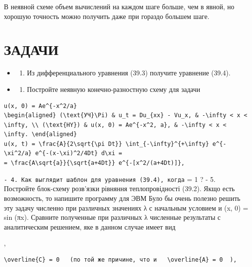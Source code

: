 \documentclass[
  ukrainian,
]{article}
\providecommand{\tightlist}{%
  \setlength{\itemsep}{0pt}\setlength{\parskip}{0pt}}
\begin{document}
В неявной схеме объем вычислений на каждом шаге больше, чем в явной, но
хорошую точность можно получить даже при гораздо большем шаге.

\section{ЗАДАЧИ}\label{ux437ux430ux434ux430ux447ux438-7}

\begin{itemize}
\tightlist
\item
  \begin{enumerate}
  \def\labelenumi{\arabic{enumi}.}
  \tightlist
  \item
    Из дифференциального уравнения (39.3) получите уравнение (39.4).
  \end{enumerate}
\item
  \begin{enumerate}
  \def\labelenumi{\arabic{enumi}.}
  \setcounter{enumi}{1}
  \tightlist
  \item
    Постройте неявную конечно-разностную схему для задачи
  \end{enumerate}
\end{itemize}

\begin{verbatim}
u(x, 0) = Ae^{-x^2/a}
\begin{aligned} (\text{УЧ}\Pi) & u_t = Du_{xx} - Vu_x, & -\infty < x < \infty, \\ (\text{HY}) & u(x, 0) = Ae^{-x^2, a}, & -\infty < x < \infty. \end{aligned}
u(x, t) = \frac{A}{2\sqrt{\pi Dt}} \int_{-\infty}^{+\infty} e^{-\xi^2/a} e^{-(x-\xi)^2/4Dt} d\xi =
= \frac{A\sqrt{a}}{\sqrt{a+4Dt}} e^{-[x^2/(a+4Dt)]},
\end{verbatim}

\texttt{-\ 4.\ Как\ выглядит\ шаблон\ для\ уравнения\ (39.4),\ когда}
\lambda = 1 ? - 5. Постройте блок-схему розв'язки рівняння
теплопровідності (39.2). Якщо есть возможность, то напишите программу
для ЭВМ Було бы очень полезно решить эту задачу численно при различных
значениях λ с начальным условием и (x, 0) = sin (πx). Сравните
полученные при различных λ численные результаты с аналитическим
решением, яке в данном случае имеет вид

,

\begin{verbatim}
\overline{C} = 0   (по той же причине, что и   \overline{A} = 0  ),
\end{verbatim}
\end{document}
